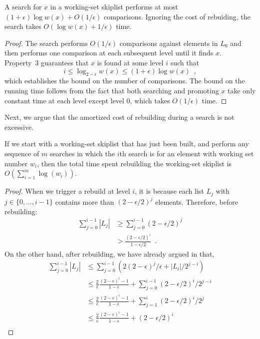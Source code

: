\documentclass[lotsofwhite]{patmorin}
\begin{document}
\begin{lem}
  A search for $x$ in a working-set skiplist performs at most
  $(1+\epsilon)\log w(x) + O(1/\epsilon)$ comparisons.  Ignoring the
  cost of rebuiding, the search takes $O(\log w(x) + 1/\epsilon)$ time.
\end{lem}

\begin{proof}
The search performs $O(1/\epsilon)$ comparisons against elements in $L_0$
and then performs one comparison at each subsequent level until it finds
$x$.  Property~3 guarantees that $x$ is found at some level $i$ such that
\[
     i \le \log_{2-\epsilon} w(x) \le (1+\epsilon)\log w(x) \enspace ,
\]
which establishes the bound on the number of comparisons.  The bound on
the running time follows from the fact that both searching and promoting
$x$ take only constant time at each level except level 0, which takes
$O(1/\epsilon)$ time.
\end{proof}

Next, we argue that the amortized cost of rebuilding during a search is
not excessive.

\begin{lem}
   If we start with a working-set skiplist that has just been built, and
   perform any sequence of $m$ searches in which the $i$th search is for
   an element with working set number $w_i$, then the total time spent
   rebuilding the working-set skiplist is $O(\sum_{i=1}^m \log(w_i))$.
\end{lem}

\begin{proof}

When we trigger a rebuild at level $i$, it is because each list $L_j$ with $j\in\{0,\ldots,i-1\}$ contains more than $(2-\epsilon/2)^j$ elements.   Therefore, before rebuilding:
\begin{align*}
    \sum_{j=0}^{i-1} |L_j| 
           & \ge \sum_{j=0}^{i-1} (2-\epsilon/2)^j \\
           & > \frac{(2-\epsilon/2)^i}{1-\epsilon/2} \enspace .
\end{align*}
On the other hand, after rebuilding, we have already argued in 
 that, 
\begin{align*}
  \sum_{j=0}^{i-1}|L_j| 
     & \le \sum_{j=0}^{i-1}\left(2(2-\epsilon)^j/\epsilon + |L_i|/2^{j-i}\right)\\
     & \le \frac{2}{\epsilon}\frac{(2-\epsilon)^i-1}{1-\epsilon} 
           + \sum_{j=0}^{i-1} (2-\epsilon/2)^i/2^{j-i}\\
     & \le \frac{2}{\epsilon}\frac{(2-\epsilon)^i-1}{1-\epsilon} 
           + \sum_{j=1}^{i} (2-\epsilon/2)^i/2^{j}\\
     & \le \frac{2}{\epsilon}\frac{(2-\epsilon)^i-1}{1-\epsilon} 
           + (2-\epsilon/2)^i\\
\end{align*}
\end{proof}
\end{document}
